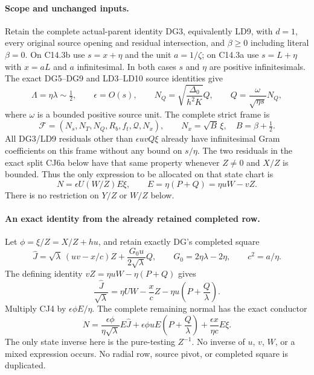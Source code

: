 \paragraph{Scope and unchanged inputs.}
Retain the complete actual-parent identity DG3, equivalently LD9,
with $d=1$, every original source opening and residual intersection,
and $\beta\ge0$ including literal $\beta=0$.  On C14.3b use
$s=x+\eta$ and the unit $a=1/\zeta$; on C14.3a use $s=L+\eta$
with $x=aL$ and $a$ infinitesimal.  In both cases $s$ and $\eta$
are positive infinitesimals.  The exact DG5--DG9 and LD3--LD10 source identities give
\[
 \Lambda=\eta\lambda\sim\tfrac12,\qquad
 \epsilon=O(s),\qquad
 N_Q=\sqrt{\frac{\Delta_0}{h^2K}}Q,
 \qquad
 Q=\frac{\omega}{\sqrt{\eta s}}N_Q,                 \tag{CJ1}
\]
where $\omega$ is a bounded positive source unit.  The complete strict
frame is
\[
 \mathcal F=(N_s,N_T,N_Q,R_b,f_t,\mathcal Q,N_x),
 \qquad N_x=\sqrt B\,\xi,\quad B=\beta+\tfrac12.
                                                               \tag{CJ2}
\]
All DG3/LD9 residuals other than $\epsilon uvQ\xi$ already have
infinitesimal Gram coefficients on this frame without any bound on
$s/\eta$.  The two residuals in the exact split CJ6a below have that same
property whenever $Z\ne0$ and $X/Z$ is bounded.  Thus the only
expression to be allocated on that state chart is
\[
 N=\epsilon U(W/Z)E\xi,
 \qquad E=\eta(P+Q)=\eta uW-vZ.                    \tag{CJ3}
\]
There is no restriction on $Y/Z$ or $W/Z$ below.

\paragraph{An exact identity from the already retained completed row.}
Let $\phi=\xi/Z=X/Z+hu$, and retain exactly DG's completed square
\[
 \widehat J=\sqrt\lambda\,(uv-x/c)Z
       +\frac{G_0u}{2\sqrt\lambda}Q,
 \qquad G_0=2\eta\lambda-2\eta,\qquad c^2=a/\eta.
\]
The defining identity $vZ=\eta uW-\eta(P+Q)$ gives
\[
 \boxed{\quad
 \frac{\widehat J}{\sqrt\lambda}
 =\eta U W-\frac{x}{c}Z
                -\eta u\left(P+\frac Q\lambda\right).
 \quad}                                                       \tag{CJ4}
\]
Multiply CJ4 by $\epsilon\phi E/\eta$.  The complete remaining
normal has the exact conductor
\[
 \boxed{\quad
 N=\frac{\epsilon\phi}{\eta\sqrt\lambda}E\widehat J
       +\epsilon\phi uE\left(P+\frac Q\lambda\right)
       +\frac{\epsilon x}{\eta c}E\xi .
 \quad}                                                       \tag{CJ5}
\]
The only state inverse here is the pure-testing $Z^{-1}$.  No inverse
of $u$, $v$, $W$, or a mixed expression occurs.  No radial row, source
pivot, or completed square is duplicated.

